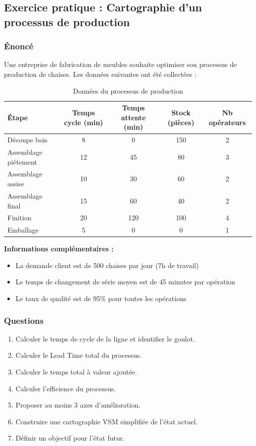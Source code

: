 \documentclass[a4paper,12pt]{article}
\begin{document}
\subsection{Exercice pratique : Cartographie d'un processus de production}

\subsubsection{Énoncé}

Une entreprise de fabrication de meubles souhaite optimiser son processus de production de chaises. Les données suivantes ont été collectées :

\begin{table}[ht]
\centering
\begin{tabular}{|l|c|c|c|c|}
\hline
\textbf{Étape} & \textbf{Temps cycle (min)} & \textbf{Temps attente (min)} & \textbf{Stock (pièces)} & \textbf{Nb opérateurs} \\
\hline
Découpe bois & 8 & 0 & 150 & 2 \\
Assemblage piétement & 12 & 45 & 80 & 3 \\
Assemblage assise & 10 & 30 & 60 & 2 \\
Assemblage final & 15 & 60 & 40 & 2 \\
Finition & 20 & 120 & 100 & 4 \\
Emballage & 5 & 0 & 0 & 1 \\
\hline
\end{tabular}
\caption{Données du processus de production}
\end{table}

\textbf{Informations complémentaires :}
\begin{itemize}
    \item La demande client est de 500 chaises par jour (7h de travail)
    \item Le temps de changement de série moyen est de 45 minutes par opération
    \item Le taux de qualité est de 95\% pour toutes les opérations
\end{itemize}

\subsubsection{Questions}

\begin{enumerate}
    \item Calculer le temps de cycle de la ligne et identifier le goulot.
    \item Calculer le Lead Time total du processus.
    \item Calculer le temps total à valeur ajoutée.
    \item Calculer l'efficience du processus.
    \item Proposer au moins 3 axes d'amélioration.
    \item Construire une cartographie VSM simplifiée de l'état actuel.
    \item Définir un objectif pour l'état futur.
\end{enumerate}
\end{document}
